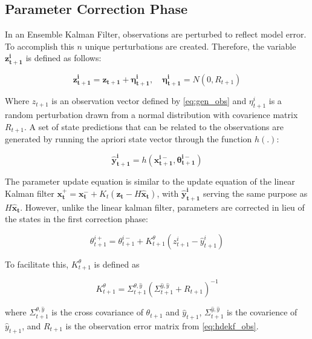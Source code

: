 \subsection{Parameter Correction Phase}

In an Ensemble Kalman Filter, observations are perturbed to reflect model error. To accomplish this $n$ unique perturbations are created. Therefore, the variable $\mathbf{z_{t+1}^{i}}$ is defined as follows:

\begin{equation}\label{eq:hdekf_obs}
\mathbf{z_{t+1}^{i}} = \mathbf{z_{t+1}} + \mathbf{\eta_{t+1}^{i}},\quad \mathbf{\eta_{t+1}^{i}} = N(0,R_{t+1})
\end{equation}

Where $z_{t+1}$ is an observation vector defined by \eqref{eq:gen_obs} and $\eta_{t+1}^{i}$ is a random perturbation drawn from a normal distribution with covarience matrix $R_{t+1}$. A set of state predictions that can be related to the observations are generated by running the apriori state vector through the function $h(.)$:

\begin{equation}\label{eq:hdekf_pred}
\mathbf{\hat{y}_{t+1}^{i}} = h(\mathbf{x_{t+1}^{i-}}, \mathbf{\theta_{t+1}^{i-}})
\end{equation}

The parameter update equation is similar to the update equation of the linear Kalman filter $\mathbf{x^{+}_{t}} = \mathbf{x^{-}_{t}} + K_{t}(\mathbf{z_{t}}-H\mathbf{\hat{x}_{t}})$, with $\mathbf{\hat{y}_{t+1}^{i}}$ serving the same purpose as $H\mathbf{\hat{x}_{t}}$. However, unlike the linear kalman filter,  parameters are corrected in lieu of the states in the first correction phase:

\begin{equation}\label{eq:hdekf_param_update}
\theta_{t+1}^{i+} = \theta_{t+1}^{i-} + K_{t+1}^{\theta}(z_{t+1}^{i}-\hat{y}_{t+1}^{i})
\end{equation}

To facilitate this, $K_{t+1}^{\theta}$ is defined as

\begin{equation}\label{eq:hdekf_param_k}
K_{t+1}^{\theta} = \Sigma^{\theta,\hat{y}}_{t+1}(\Sigma^{\hat{y},\hat{y}}_{t+1} + R_{t+1})^{-1}
\end{equation}

where $\Sigma^{\theta,\hat{y}}_{t+1}$ is the cross covariance of $\theta_{t+1}$ and $\hat{y}_{t+1}$, $\Sigma^{\hat{y},\hat{y}}_{t+1}$ is the covarience of $\hat{y}_{t+1}$, and $R_{t+1}$ is the observation error matrix from \eqref{eq:hdekf_obs}. 

